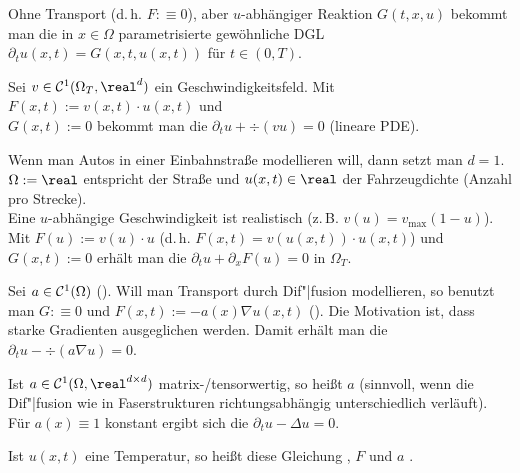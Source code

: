\linie

\begin{Bsp}
    Ohne Transport (d.\,h. $F :\equiv 0$), aber $u$-abhängiger Reaktion $G(t, x, u)$ bekommt man
    die in $x \in \Omega$ parametrisierte gewöhnliche DGL
    $\partial_t u(x, t) = G(x, t, u(x, t))$ für $t \in (0, T)$.
\end{Bsp}

\linie

\begin{Bsp}
    Sei $v \in \C^1(\Omega_T, \real^d)$ ein Geschwindigkeitsfeld.
    Mit $F(x, t) := v(x, t) \cdot u(x, t)$ und\\
    $G(x, t) := 0$ bekommt man die
     $\partial_t u + \div(vu) = 0$
    (lineare PDE).
\end{Bsp}

\linie

\begin{Bsp}
    Wenn man Autos in einer Einbahnstraße modellieren will,
    dann setzt man $d = 1$.
    $\Omega := \real$ entspricht der Straße
    und $u(x, t) \in \real$ der Fahrzeugdichte (Anzahl pro Strecke).\\
    Eine $u$-abhängige Geschwindigkeit ist realistisch (z.\,B. $v(u) = v_{\max}(1 - u)$).\\
    Mit $F(u) := v(u) \cdot u$ (d.\,h. $F(x, t) = v(u(x, t)) \cdot u(x, t)$)
    und $G(x, t) := 0$ erhält man die 
    $\partial_t u + \partial_x F(u) = 0$ in $\Omega_T$.
\end{Bsp}

\linie
\pagebreak

\begin{Bsp}
    Sei $a \in \mathcal{C}^1(\Omega)$ ().
    Will man Transport durch Dif"|fusion modellieren, so benutzt man
    $G :\equiv 0$ und $F(x, t) := -a(x) \nabla u(x, t)$ ().
    Die Motivation ist, dass starke Gradienten ausgeglichen werden.
    Damit erhält man die 
    $\partial_t u - \div(a \nabla u) = 0$.

    Ist $a \in \C^1(\Omega, \real^{d \times d})$ matrix-/tensorwertig, so heißt $a$
     (sinnvoll, wenn die Dif"|fusion wie in Faserstrukturen
    richtungsabhängig unterschiedlich verläuft).
    Für $a(x) \equiv 1$ konstant ergibt sich die 
    $\partial_t u - \Delta u = 0$.

    Ist $u(x, t)$ eine Temperatur, so heißt diese Gleichung
    ,
    $F$  und $a$ .
\end{Bsp}

